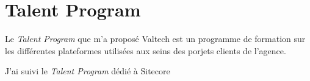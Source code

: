 \section{Talent Program}
\label{sec:talent-program}
Le \emph{Talent Program} que m'a proposé Valtech est un
programme de formation sur les différentes plateformes utilisées aux seins
des porjets clients de l'agence.

J'ai suivi le \emph{Talent Program} dédié à Sitecore